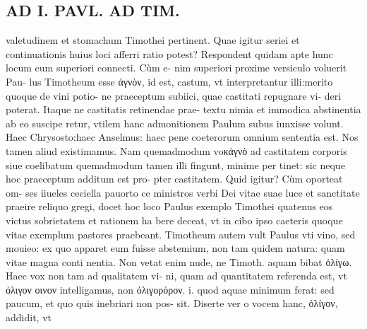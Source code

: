 \documentclass{article}
\begin{document}
\begin{pages}
\section*{AD I. PAVL. AD TIM. }
\marginpar{[ p.368 ]}\pstart valetudinem et stomachum Timothei pertinent. Quae igitur seriei et continuationis huius loci afferri ratio potest? Respondent quidam apte hunc locum cum superiori connecti. Cùm e- nim superiori proxime versiculo voluerit Pau- lus Timotheum esse ἀγνὸν, id est, castum, vt interpretantur illi:merito quoque de vini potio- ne praeceptum subiici, quae castitati repugnare vi- deri poterat. Itaque ne castitatis retinendae prae- textu nimia et immodica abstinentia ab eo suscipe retur, vtilem hanc admonitionem Paulum subus  iunxisse volunt. Haec Chrysosto:haec Anselmus: haec pene coeterorum omnium sententia est. Nos tamen aliud existimamus. Nam quemadmodum voκάγνὸ ad castitatem corporis siue coelibatum quemadmodum tamen illi fingunt, minime per tinet: sic neque hoc praeceptum additum est pro- pter castitatem. Quid igitur? Cùm oporteat om- ses iiueles ceciella pauorto ce ministros verbi Dei vitae suae luce et sanctitate praeire reliquo gregi, docet hoc loco Paulus exemplo Timothei quatenus eos victus sobrietatem et rationem ha bere deceat, vt in cibo ipso caeteris quoque vitae exemplum pastores praebeant.  \pend\pstart Timotheum autem vult Paulus vti vino, sed mouieo: ex quo apparet eum fuisse abstemium, non tam quidem natura: quam vitae magna conti nentia. Non vetat enim nude, ne Timoth. aquam bibat ὀλίγω. Haec vox non tam ad qualitatem vi- ni, quam ad quantitatem referenda est, vt ὀλιγον οινον intelligamus, non ὀλιγορόρον. i. quod aquae minimum ferat: sed paucum, et quo quis inebriari non pos- sit. Diserte ver o vocem hanc, ὀλίγον, addidit, vt  \pend

\end{pages}
\end{document}
